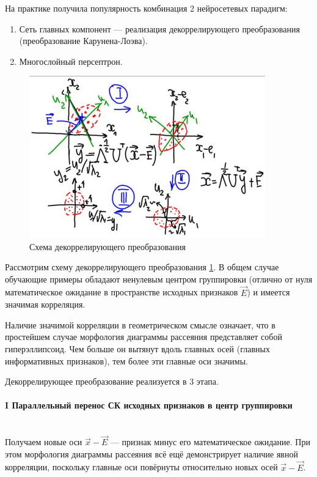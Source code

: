 \documentclass{article}
\numberwithin{equation}{subsection}
\begin{document}
На практике получила популярность комбинация 2 нейросетевых парадигм:
\begin{enumerate}
    \item Сеть главных компонент --- реализация декоррелирующего преобразования
        (преобразование Карунена-Лоэва).
    \item Многослойный персептрон.
\end{enumerate}

\begin{figure}[htbp]
    \centering
    \includegraphics[height=7cm]{hyperflat_11_1.jpeg}
    \caption{Схема декоррелирующего преобразования}
    \label{hyperflat_11_1_prev}
\end{figure}

Рассмотрим схему декоррелирующего преобразования \ref{hyperflat_11_1_prev}.
В общем случае обучающие примеры обладают ненулевым центром группировки (отлично от нуля
математическое ожидание в пространстве исходных признаков $\vec{E}$) и имеется
значимая корреляция.

Наличие значимой корреляции в геометрическом смысле означает, что в простейшем случае
морфология диаграммы рассеяния представляет собой гиперэллипсоид. Чем больше он вытянут 
вдоль главных осей (главных информативных признаков), тем более эти главные оси значимы.

Декоррелирующее преобразование реализуется в 3 этапа.


\paragraph{I Параллельный перенос СК исходных признаков в центр группировки}\mbox{}\\
Получаем новые оси $\vec{x}-\vec{E}$ --- признак минус его математическое ожидание.
При этом морфология диаграммы рассеяния всё ещё демонстрирует наличие явной корреляции,
поскольку главные оси повёрнуты относительно новых осей $\vec{x}-\vec{E}$.
\end{document}
